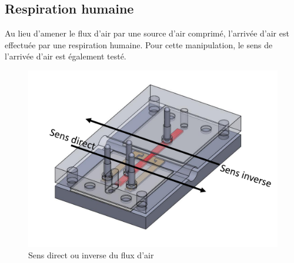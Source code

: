 \subsection{Respiration humaine}
Au lieu d'amener le flux d'air par une source d'air comprimé, l'arrivée d'air est effectuée par une respiration humaine. Pour cette manipulation, 
le sens de l'arrivée d'air est également testé. 
\begin{figure}[H]
    \centering
    \includegraphics[scale = 0.3]{assets/figures/Inverse_direct.pdf}
    \caption{Sens direct ou inverse du flux d'air}
    \label{fig:direct_inverse}
\end{figure}

